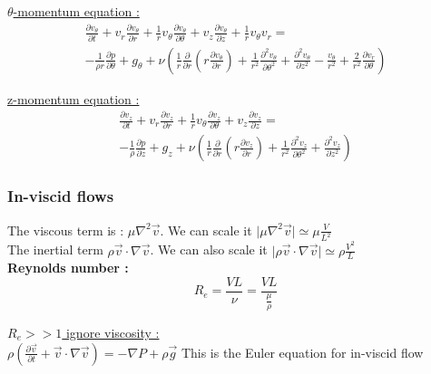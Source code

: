 \documentclass[../main.tex]{subfiles}
\begin{document}
\underline{$\theta$-momentum equation :} \begin{equation}
    \begin{gathered}
        \frac{\partial v_\theta}{\partial t} + v_r \frac{\partial v_\theta}{\partial r} + \frac{1}{r} v_\theta \frac{\partial v_\theta}{\partial \theta} + v_z \frac{\partial v_\theta}{\partial z} + \frac{1}{r}v_\theta v_r = \\
        -\frac{1}{\rho r} \frac{\partial p}{\partial \theta} + g_\theta + \nu(\frac{1}{r} \frac{\partial}{\partial r}(r \frac{\partial v_\theta}{\partial r}) + \frac{1}{r^2} \frac{\partial^2 v_\theta}{\partial \theta^2} + \frac{\partial^2 v_\theta}{\partial z^2} - \frac{v_\theta}{r^2} + \frac{2}{r^2}\frac{\partial v_r}{\partial \theta})
    \end{gathered}
\end{equation}

\underline{z-momentum equation :} \begin{equation}
    \begin{gathered}
        \frac{\partial v_z}{\partial t} + v_r \frac{\partial v_z}{\partial r} + \frac{1}{r} v_\theta \frac{\partial v_z}{\partial \theta} + v_z \frac{\partial v_z}{\partial z} = \\
        -\frac{1}{\rho } \frac{\partial p}{\partial z} + g_z + \nu(\frac{1}{r} \frac{\partial}{\partial r}(r \frac{\partial v_z}{\partial r}) + \frac{1}{r^2} \frac{\partial^2 v_z}{\partial \theta^2} + \frac{\partial^2 v_z}{\partial z^2})
    \end{gathered}
\end{equation}

\subsubsection{In-viscid flows}
The viscous term is : $\mu \nabla^2 \Vec{v}$. We can scale it $\lvert \mu \nabla^2 \Vec{v}\rvert \simeq \mu \frac{V}{L^2}$\\
The inertial term $\rho \Vec{v}\cdot \nabla \Vec{v}$. We can also scale it $\lvert \rho \Vec{v}\cdot \nabla \Vec{v}\rvert \simeq \rho \frac{V^2}{L}$\\

\textbf{Reynolds number :} \begin{equation}
    R_e = \frac{VL}{\nu} = \frac{VL}{\frac{\mu}{\rho}}
\end{equation}

\underline{$R_e>>1$ ignore viscosity :}\\
$\rho( \frac{\partial \Vec{v}}{\partial t} + \Vec{v} \cdot \nabla \Vec{v}) = -\nabla P + \rho \Vec{g}$ This is the Euler equation for in-viscid flow\\
\end{document}
